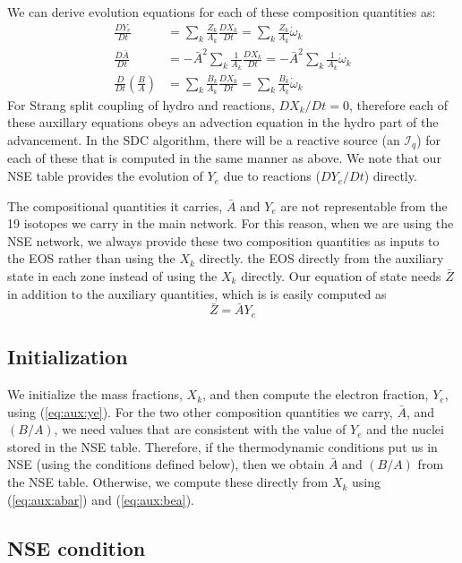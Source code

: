 \documentclass[times,modern]{aastex63}
\newcommand{\omegadot}{\dot{\omega}}
\newcommand{\Ic}{{\boldsymbol{\mathcal{I}}}}
\begin{document}
We can derive evolution equations for each of these composition quantities as:
\begin{align}
\frac{DY_e}{Dt} &= \sum_k \frac{Z_k}{A_k} \frac{DX_k}{Dt} = \sum_k \frac{Z_k}{A_k} \omegadot_k \\
\frac{D\bar{A}}{Dt} &= -\bar{A}^2 \sum_k \frac{1}{A_k} \frac{DX_k}{Dt} = -\bar{A}^2 \sum_k \frac{1}{A_k} \omegadot_k \\
\frac{D}{Dt} \left (\frac{B}{A} \right ) &= \sum_k \frac{B_k}{A_k} \frac{DX_k}{Dt} = \sum_k \frac{B_k}{A_k} \omegadot_k
\end{align}
For Strang split coupling of hydro and reactions, $DX_k/Dt = 0$,
therefore each of these auxillary equations obeys an advection
equation in the hydro part of the advancement.  In the SDC algorithm,
there will be a reactive source (an $\Ic_q$) for each of these that is
computed in the same manner as above.  We note that our NSE table
provides the evolution of $Y_e$ due to reactions ($DY_e/Dt$) directly.

The compositional quantities
it carries, $\bar{A}$ and $Y_e$ are not representable from the 19
isotopes we carry in the main network. For this reason, when we are
using the NSE network, we always provide these two composition quantities as
inputs to the EOS rather than using the $X_k$ directly.
the EOS directly from the auxiliary state in each zone instead of
using the $X_k$ directly.
Our equation of state needs $\bar{Z}$ in addition
to the auxiliary quantities, which is is easily computed as
\begin{equation}
\bar{Z} = \bar{A} Y_e
\end{equation}

\subsection{Initialization}

We initialize the mass fractions, $X_k$, and then compute the
electron fraction, $Y_e$, using (\ref{eq:aux:ye}).
For the two other composition
quantities we carry, $\bar{A}$, and $(B/A)$, we need values that are
consistent with the value of $Y_e$ and the nuclei stored in the NSE
table.  Therefore, if the thermodynamic conditions put us in NSE
(using the conditions defined below), then we obtain $\bar{A}$ and
$(B/A)$ from the NSE table.  Otherwise, we compute these directly from
$X_k$ using (\ref{eq:aux:abar}) and (\ref{eq:aux:bea}).

\subsection{NSE condition}
\end{document}
